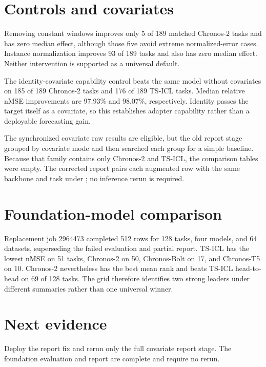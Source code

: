 \documentclass[10pt,a4paper]{article}
\newcommand{\code}[1]{\texttt{\detokenize{#1}}}
\begin{document}
\section{Controls and covariates}
Removing constant windows improves only 5 of 189 matched Chronos-2 tasks and
has zero median effect, although those five avoid extreme normalized-error
cases. Instance normalization improves 93 of 189 tasks and also has zero
median effect. Neither intervention is supported as a universal default.

The identity-covariate capability control beats the same model without
covariates on 185 of 189 Chronos-2 tasks and 176 of 189 TS-ICL tasks. Median
relative nMSE improvements are 97.93\% and 98.07\%, respectively. Identity
passes the target itself as a covariate, so this establishes adapter capability
rather than a deployable forecasting gain.

The synchronized covariate raw results are eligible, but the old report stage
grouped by covariate mode and then searched each group for a simple baseline.
Because that family contains only Chronos-2 and TS-ICL, the comparison tables
were empty. The corrected report pairs each augmented row with the same
backbone and task under \code{covariate_mode=none}; no inference rerun is
required.

\section{Foundation-model comparison}
Replacement job 2964473 completed 512 rows for 128 tasks, four models, and 64
datasets, superseding the failed evaluation and partial report. TS-ICL has the
lowest nMSE on 51 tasks, Chronos-2 on 50, Chronos-Bolt on 17, and Chronos-T5 on
10. Chronos-2 nevertheless has the best mean rank and beats TS-ICL
head-to-head on 69 of 128 tasks. The grid therefore identifies two strong
leaders under different summaries rather than one universal winner.

\section{Next evidence}
Deploy the report fix and rerun only the full covariate report stage. The
foundation evaluation and report are complete and require no rerun.
\end{document}
